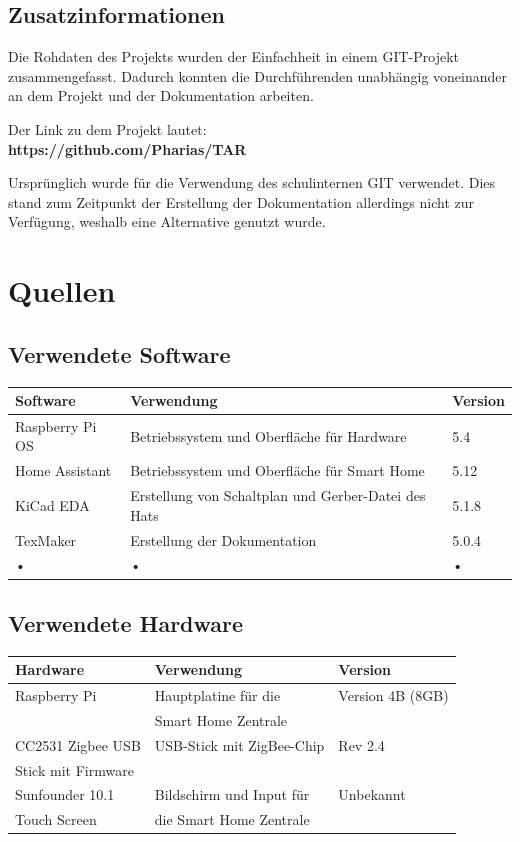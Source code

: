 \documentclass[12pt,a4paper]{article}
\begin{document}
 	\subsection{Zusatzinformationen}
 	Die Rohdaten des Projekts wurden der Einfachheit in einem GIT-Projekt zusammengefasst. Dadurch konnten die Durchführenden unabhängig voneinander an dem Projekt und der Dokumentation arbeiten.\par
 	Der Link zu dem Projekt lautet:\\
 	\textbf{https://github.com/Pharias/TAR}\par
 	Ursprünglich wurde für die Verwendung des schulinternen GIT verwendet. Dies stand zum Zeitpunkt der Erstellung der Dokumentation allerdings nicht zur Verfügung, weshalb eine Alternative genutzt wurde.
 	\newpage
 	\section{Quellen}
 	\subsection{Verwendete Software}
 	\begin{tabular}{|l|l|l|}
 	\hline 
 	\textbf{Software} & \textbf{Verwendung} & \textbf{Version} \\ 
 	\hline 
 	Raspberry Pi OS & Betriebssystem und Oberfläche für Hardware & 5.4 \\ 
 	\hline 
 	Home Assistant & Betriebssystem und Oberfläche für Smart Home & 5.12 \\ 
 	\hline 
 	KiCad EDA & Erstellung von Schaltplan und Gerber-Datei des Hats & 5.1.8 \\ 
 	\hline 
 	TexMaker & Erstellung der Dokumentation & 5.0.4 \\ 
 	\hline 
 	• & • & • \\ 
 	\hline 
 	\end{tabular} 
 	\subsection{Verwendete Hardware}
 	\begin{tabular}{|l|l|l|}
 	\hline
 	\textbf{Hardware} & \textbf{Verwendung} & \textbf{Version} \\
 	\hline
 	Raspberry Pi & Hauptplatine für die  & Version 4B (8GB)\\
 	 & Smart Home Zentrale &\\
 	\hline
 	CC2531 Zigbee USB & USB-Stick mit ZigBee-Chip & Rev 2.4\\
 	Stick mit Firmware& & \\
 	\hline
 	Sunfounder 10.1  & Bildschirm und Input für & Unbekannt\\
 	Touch Screen & die Smart Home Zentrale & \\
 	 \hline
 	\end{tabular}
\end{document}
